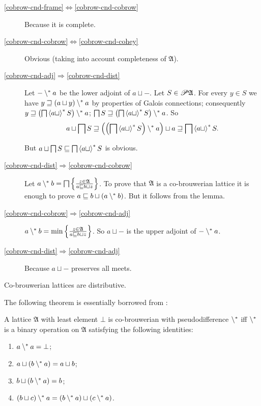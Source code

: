 \begin{description}
\item [{\ref{cobrow-cnd-frame}$\Leftrightarrow$\ref{cobrow-cnd-cobrow}}] Because it is complete.
\item [{\ref{cobrow-cnd-cobrow}$\Leftrightarrow$\ref{cobrow-cnd-cohey}}] Obvious
(taking into account completeness of $\mathfrak{A}$).
\item [{\ref{cobrow-cnd-adj}$\Rightarrow$\ref{cobrow-cnd-dist}}] Let
$\mathord-\setminus^{\ast} a$ be the lower adjoint of $a\sqcup\mathord-$.
Let $S\in\mathscr{P}\mathfrak{A}$. For every $y\in S$ we have $y\sqsupseteq(a\sqcup y)\setminus^{\ast} a$
by properties of Galois connections; consequently $y\sqsupseteq\left(\bigsqcap\left\langle a\sqcup\right\rangle ^{\ast}S\right)\setminus^{\ast} a$;
$\bigsqcap S\sqsupseteq\left(\bigsqcap\left\langle a\sqcup\right\rangle ^{\ast}S\right)\setminus^{\ast} a$.
So
\[
a\sqcup\bigsqcap S\sqsupseteq\left(\left(\bigsqcap\left\langle a\sqcup\right\rangle ^{\ast}S\right)\setminus^{\ast} a\right)\sqcup a\sqsupseteq\bigsqcap\left\langle a\sqcup\right\rangle ^{\ast}S.
\]



But $a\sqcup\bigsqcap S\sqsubseteq\bigsqcap\left\langle a\sqcup\right\rangle ^{\ast}S$ is
obvious.

\item [{\ref{cobrow-cnd-dist}$\Rightarrow$\ref{cobrow-cnd-cobrow}}] Let
$a\setminus^{\ast} b=\bigsqcap\left\{ \frac{z\in\mathfrak{A}}{a\sqsubseteq b\sqcup z}\right\}$.
To prove that $\mathfrak{A}$ is a co-brouwerian lattice it is enough
to prove $a\sqsubseteq b\sqcup(a\setminus^{\ast} b)$. But it follows from
the lemma.
\item [{\ref{cobrow-cnd-cobrow}$\Rightarrow$\ref{cobrow-cnd-adj}}] $a\setminus^{\ast} b=\min\left\{ \frac{z\in\mathfrak{A}}{a\sqsubseteq b\sqcup z}\right\}$.
So $a\sqcup\mathord-$ is the upper adjoint of $\mathord-\setminus^{\ast} a$.
\item [{\ref{cobrow-cnd-dist}$\Rightarrow$\ref{cobrow-cnd-adj}}] Because
$a\sqcup\mathord-$ preserves all meets.\end{description}
\begin{cor}
Co-brouwerian lattices are distributive.
\end{cor}
The following theorem is essentially borrowed from \cite{stone-spaces}:
\begin{thm}
A lattice $\mathfrak{A}$ with least element $\bot$ is co-brouwerian
with pseudodifference $\setminus^{\ast}$ iff $\setminus^{\ast}$ is a binary
operation on $\mathfrak{A}$ satisfying the following identities:
\begin{enumerate}
\item \label{cbpd-aa}$a\setminus^{\ast} a=\bot$;
\item \label{cbpd-aba}$a\sqcup(b\setminus^{\ast} a)=a\sqcup b$;
\item \label{cbpd-bba}$b\sqcup(b\setminus^{\ast} a)=b$;
\item \label{cbpd-bca}$(b\sqcup c)\setminus^{\ast} a=(b\setminus^{\ast} a)\sqcup(c\setminus^{\ast} a)$.
\end{enumerate}
\end{thm}
